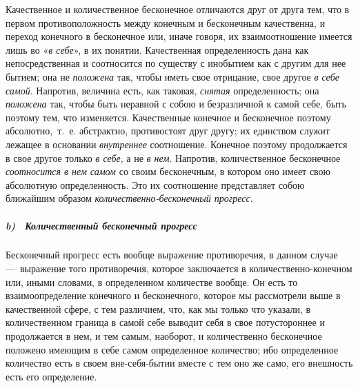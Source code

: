 {Качественное и количественное бесконечное отличаются друг от друга тем, что
в первом противоположность между конечным и бесконечным качественна, и
переход конечного в бесконечное или, иначе говоря, их взаимоотношение
имеется лишь во «{\em в себе}», в их понятии.
Качественная определенность дана как непосредственная и соотносится по
существу с инобытием как с другим для нее бытием; она не
{\em положена} так, чтобы иметь свое отрицание, свое
другое {\em в себе самой}. Напротив, величина есть, как
таковая, {\em снятая} определенность; она
{\em положена} так, чтобы быть неравной с собою и
безразличной к самой себе, быть поэтому тем, что изменяется. Качественные
конечное и бесконечное поэтому абсолютно,~т.~е. абстрактно, противостоят
друг другу; их единством служит лежащее в основании
{\em внутреннее} соотношение. Конечное поэтому
продолжается в свое другое только {\em в себе}, а не
{\em в нем}. Напротив, количественное бесконечное
{\em соотносится в нем самом} со своим бесконечным, в
котором оно имеет свою абсолютную определенность. Это их соотношение
представляет собою ближайшим образом
{\em количественно-бесконечный прогресс}.

\subparagraph[b) \ Количественный бесконечный прогресс]{b) \ Количественный
бесконечный прогресс}
Бесконечный прогресс есть вообще выражение противоречия, в данном случае
—~выражение того противоречия, которое заключается в количественно-конечном
или, иными словами, в определенном количестве вообще. Он есть то
взаимоопределение конечного и бесконечного, которое мы рассмотрели выше в
качественной сфере, с тем различием, что, как мы только что указали, в
количественном граница в самой себе выводит себя в свое потустороннее и
продолжается в нем, и тем самым, наоборот, и количественно бесконечное
положено имеющим в себе самом определенное количество; ибо определенное
количество есть в своем вне-себя-бытии вместе с тем оно же само, его
внешность есть его определение.

}
